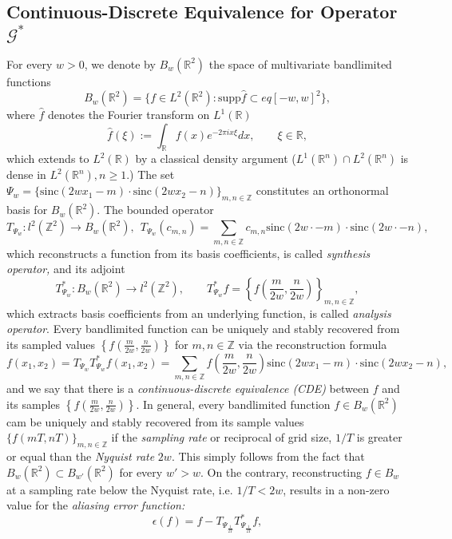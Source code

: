 \documentclass[reqno,10pt]{amsart}
\theoremstyle{plain}
\newcommand{\sinc}{\text{sinc}}
\theoremstyle{definition}
\newcommand{\bb}[1]{\mathbb{#1}}
\newcommand{\cal}[1]{\mathcal{#1}}
\begin{document}
    \subsection{Continuous-Discrete Equivalence for Operator \texorpdfstring{$\cal G^*$}{}}
    For every $w > 0$, we denote by $B_w(\bb R^2)$ the space of multivariate bandlimited functions
    $$B_w(\bb R^2) = \{f \in L^2(\bb R^2) : \text{supp}\hat{f} \subset eq [-w,w]^2\},$$
    where $\hat{f}$ denotes the Fourier transform on $L^1(\bb R)$ 
    $$ \hat{f}(\xi) := \int_{\bb R}f(x) e^{-2\pi ix\xi} dx, \qquad \xi \in \bb R,$$
    which extends to $L^2(\bb R)$ by a classical density argument ($L^1(\bb R^n) \cap L^2(\bb R^n)$ is dense in $L^2(\bb R^n), n \geq 1$.) The set $\Psi_w = \{\sinc(2wx_1 - m) \cdot \sinc(2wx_2 - n)\}_{m,n \in \bb Z}$ constitutes an orthonormal basis for $B_w(\bb R^2)$. The bounded operator
    $$ T_{\Psi_w} :l^2(\bb Z^2) \to B_w(\bb R^2), ~~ T_{\Psi_w}(c_{m,n}) = \sum_{m,n\in \bb Z} c_{m,n} \sinc(2w\cdot - m)\cdot \sinc(2w\cdot -n),$$
    which reconstructs a function from its basis coefficients, is called {\it synthesis operator,} and its adjoint 
    $$ T^*_{\Psi_w} : B_w(\bb R^2) \to l^2(\bb Z^2), \qquad T^*_{\Psi_w} f = \left\{f\left(\frac{m}{2w},\frac{n}{2w}\right)\right\}_{m,n \in \bb Z},$$
    which extracts basis coefficients from an underlying function, is called {\it analysis operator}.  Every bandlimited function can be uniquely and stably recovered from its sampled values $\left\{f\left(\frac{m}{2w},\frac{n}{2w}\right)\right\}$ for ${m,n \in \bb Z}$ via the reconstruction formula
    \begin{equation}
        f(x_1,x_2) = T_{\Psi_w}T^*_{\Psi_w}f(x_1,x_2) = \sum\limits_{m,n \in \bb Z} f\left(\frac{m}{2w},\frac{n}{2w}\right) \sinc(2wx_1 - m) \cdot \sinc(2wx_2 - n),
    \end{equation}
    and we say that there is a {\it continuous-discrete equivalence (CDE)} between $f$ and its samples $\left\{f\left(\frac{m}{2w},\frac{n}{2w}\right)\right\}$. In general, every bandlimited function $f \in B_w(\bb R^2)$ cam be uniquely and stably recovered from its sample values $\{f(mT,nT)\}_{m,n\in\bb Z}$ if the {\it sampling rate} or reciprocal of grid size, $1/T$ is greater or equal than the {\it Nyquist rate} $2w$. This simply follows from the fact that $B_w(\bb R^2) \subset B_{w'}(\bb R^2)$ for every $w' > w$. On the contrary, reconstructing $f \in B_w$ at a sampling rate below the Nyquist rate, i.e. $1/T < 2w$, results in a non-zero value for the {\it aliasing error function:}
    $$ \epsilon(f) = f - T_{{\Psi}_{\frac{1}{2T}}} T^*_{{\Psi}_{\frac{1}{2T}}}f,$$
\end{document}
